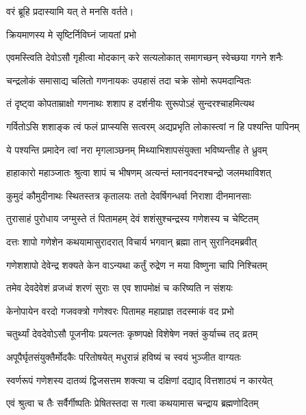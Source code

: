 \begin{center}
{वरं ब्रूहि प्रदास्यामि यत् ते मनसि वर्तते।}

\onelineshloka
{क्रियमाणस्य मे सृष्टिर्निविघ्नं जायतां प्रभो}%

\twolineshloka
{एवमस्त्विति देवोऽसौ गृहीत्वा मोदकान् करे}
{सत्यलोकात् समागच्छन् स्वेच्छया गगने शनैः}%

\twolineshloka
{चन्द्रलोकं समासाद्य चलितो गणनायकः}
{उपहासं तदा चक्रे सोमो रूपमदान्वितः}%

\twolineshloka
{तं दृष्ट्वा कोपताम्राक्षो गणनाथः शशाप ह}
{दर्शनीयः सुरूपोऽहं सुन्दरश्चाहमित्यथ}%

\twolineshloka
{गर्वितोऽसि शशाङ्क त्वं फलं प्राप्स्यसि सत्वरम्}
{अद्यप्रभृति लोकास्त्वां न हि पश्यन्ति पापिनम्}%

\twolineshloka
{ये पश्यन्ति प्रमादेन त्वां नरा मृगलाञ्छनम्}
{मिथ्याभिशापसंयुक्ता भविष्यन्तीह ते ध्रुवम्}%

\twolineshloka
{हाहाकारो महाञ्जातः श्रुत्वा शापं च भीषणम्}
{अत्यन्तं म्लानवदनश्चन्द्रो जलमथाविशत्}%

\twolineshloka
{कुमुदं कौमुदीनाथः स्थितस्तत्र कृतालयः}
{ततो देवर्षिगन्धर्वा निराशा दीनमानसाः}%

\twolineshloka
{तुरासाहं पुरोधाय जग्मुस्ते तं पितामहम्}
{देवं शशंसुश्चन्द्रस्य गणेशस्य च चेष्टितम्}%

\twolineshloka
{दत्तः शापो गणेशेन कथयामासुरादरात्}
{विचार्य भगवान् ब्रह्मा तान् सुरानिदमब्रवीत्}%

\twolineshloka
{गणेशशापो देवेन्द्र शक्यते केन वाऽन्यथा}
{कर्तुं रुद्रेण न मया विष्णुना चापि निश्चितम्}%

\twolineshloka
{तमेव देवदेवेशं व्रजध्वं शरणं सुराः}
{स एव शापमोक्षं च करिष्यति न संशयः}%


\twolineshloka
{केनोपायेन वरदो गजवक्त्रो गणेश्वरः}
{पितामह महाप्राज्ञ तदस्माकं वद प्रभो}%


\twolineshloka
{चतुर्थ्यां देवदेवोऽसौ पूजनीयः प्रयत्नतः}
{कृष्णपक्षे विशेषेण नक्तं कुर्याच्च तद् व्रतम्}%

\twolineshloka
{अपूपैर्घृतसंयुक्तैर्मोदकैः परितोषयेत्}
{मधुरान्नं हविष्यं च स्वयं भुञ्जीत वाग्यतः}%

\twolineshloka
{स्वर्णरूपं गणेशस्य दातव्यं द्विजसत्तम}
{शक्त्या च दक्षिणां दद्याद् वित्तशाठ्यं न कारयेत्}%

\twolineshloka
{एवं श्रुत्वा च तैः सर्वैर्गीष्पतिः प्रेषितस्तदा}
{स गत्वा कथयामास चन्द्राय ब्रह्मणोदितम्}%


\end{center}
